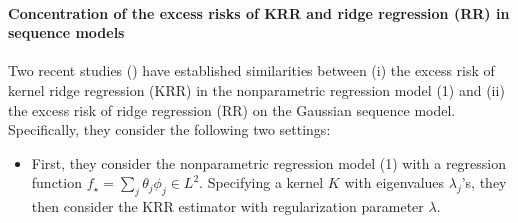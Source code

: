 \documentclass{article}
\theoremstyle{plain}
\theoremstyle{definition}
\theoremstyle{remark}
\newcommand{\reg}{\varphi_\lambda}
\newcommand*{\krr}{\mathtt{KRR}}
\begin{document}
\begin{appendix}

\iffalse
\paragraph*{Concentration of the excess risks of KRR and ridge regression (RR) in sequence models}

Two recent studies (\cite{cheng2022dimension, misiakiewicz2024non}) have established similarities between 
(i) the excess risk of kernel ridge regression (KRR) in the nonparametric regression model (1) and (ii) the excess risk of ridge regression (RR) on the Gaussian sequence model. 
Specifically, they consider the following two settings:
\begin{itemize}
    \item[(i)]  First, they consider the nonparametric regression model (1)
    with a regression function $f_{\star} = \sum_j \theta_j \phi_j \in L^2$.
    Specifying a kernel $K$ with eigenvalues $\lambda_j$'s, they then consider the KRR estimator with regularization parameter $\lambda$. 
    

\end{itemize}
\end{appendix}
\end{document}

